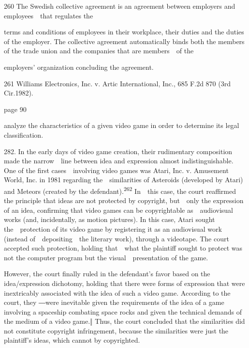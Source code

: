 \documentclass[
]{article}
\begin{document}
{260 }{The Swedish }{collective agreement }{is an agreement between
employers and employees~~that regulates the}

{terms and conditions of employees in their workplace, their duties and
the duties of the employer. The collective agreement automatically binds
both the members of the trade union and the companies that are
members~~of the}

{employers' organization concluding the agreement.}

{261 }{Williams Electronics, Inc. v. Artic International, Inc.}{, 685
F.2d 870 (3rd Cir.1982).}

{page 90}

{analyze the characteristics of a given video game in order to determine
its legal classification.}

{282. }{In the early days of video game creation, their rudimentary
composition made the narrow~~line between idea and expression almost
indistinguishable. One of the first cases~~involving video games was
}{Atari, Inc. v. Amusement World, Inc}{. in 1981 regarding
the~~similarities of }{Asteroids }{(developed by Atari) and }{Meteors
}{(created by the defendant).}\textsuperscript{{262 }}{In~~this case,
the court reaffirmed the principle that ideas are not protected by
copyright, but~~only the expression of an idea, confirming that video
games can be copyrightable as~~audiovisual works (and, incidentally, as
motion pictures). In this case, Atari sought the~~protection of its
video game by registering it as an audiovisual work (instead
of~~depositing~~the literary work), through a videotape. The court
accepted such protection, holding that~~what the plaintiff sought to
protect was not the computer program but the visual~~presentation of the
game.}

{However, the court finally ruled in the defendant's favor based on the
idea/expression }{dichotomy, holding that there were forms of expression
that were inextricably associated with the idea of such a video game.
}{According to the court, they ―}{were inevitable given the requirements
of the idea of a game involving a spaceship combating space rocks and
given the technical demands of the medium of a video game.}{‖ }{Thus,
the court concluded that the similarities did not constitute copyright
infringement, because the similarities were }{just the plaintiff's
ideas, which cannot by copyrighted}{.}
\end{document}
